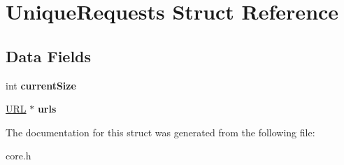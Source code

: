 \hypertarget{struct_unique_requests}{\section{Unique\-Requests Struct Reference}
\label{struct_unique_requests}
}
\subsection*{Data Fields}
\begin{DoxyCompactItemize}
\item 
\hypertarget{struct_unique_requests_a0c2f9a0a6941e32677f17cadd8626c6f}{int {\bfseries current\-Size}}\label{struct_unique_requests_a0c2f9a0a6941e32677f17cadd8626c6f}

\item 
\hypertarget{struct_unique_requests_ad46918d284540cc7ac92eacda3e9c68b}{\hyperlink{struct_u_r_l}{U\-R\-L} $\ast$ {\bfseries urls}}\label{struct_unique_requests_ad46918d284540cc7ac92eacda3e9c68b}

\end{DoxyCompactItemize}


The documentation for this struct was generated from the following file\-:\begin{DoxyCompactItemize}
\item 
core.\-h\end{DoxyCompactItemize}

